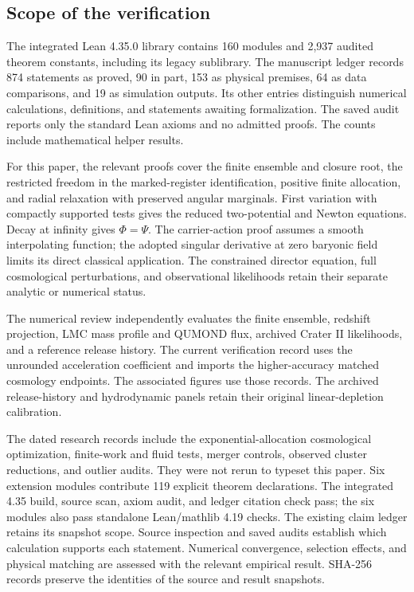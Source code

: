 \subsection{Scope of the verification}

The integrated Lean 4.35.0 library contains 160 modules and 2,937 audited theorem
constants, including its legacy sublibrary. The manuscript ledger records
874 statements as proved, 90 in part, 153 as physical premises, 64 as
data comparisons, and 19 as simulation outputs. Its other entries
distinguish numerical calculations, definitions, and statements awaiting
formalization. The saved audit reports only the standard Lean axioms
and no admitted proofs. The counts include mathematical helper results.

For this paper, the relevant proofs cover the finite ensemble and closure
root, the restricted freedom in the marked-register identification,
positive finite allocation, and radial relaxation with preserved angular
marginals. First variation with compactly supported tests gives the
reduced two-potential and Newton equations. Decay at infinity gives
$\Phi=\Psi$. The carrier-action proof assumes a smooth interpolating
function; the adopted singular derivative at zero baryonic field limits
its direct classical application. The constrained director equation,
full cosmological perturbations, and observational likelihoods retain
their separate analytic or numerical status.

The numerical review independently evaluates the finite ensemble,
redshift projection, LMC mass profile and QUMOND flux, archived Crater II
likelihoods, and a reference release history. The current verification
record uses the unrounded acceleration coefficient and imports the
higher-accuracy matched cosmology endpoints. The associated figures
use those records. The archived release-history and hydrodynamic panels
retain their original linear-depletion calibration.

The dated research records include the exponential-allocation cosmological
optimization, finite-work and fluid tests, merger controls, observed cluster
reductions, and outlier audits. They were not rerun to typeset this paper.
Six extension modules contribute 119 explicit theorem declarations.
The integrated 4.35 build, source scan, axiom audit, and ledger citation
check pass; the six modules also pass standalone Lean/mathlib 4.19 checks.
The existing claim ledger retains its snapshot scope.  Source inspection and saved
audits establish which calculation supports each statement. Numerical
convergence, selection effects, and physical matching are assessed with
the relevant empirical result. SHA-256 records preserve the identities
of the source and result snapshots.

